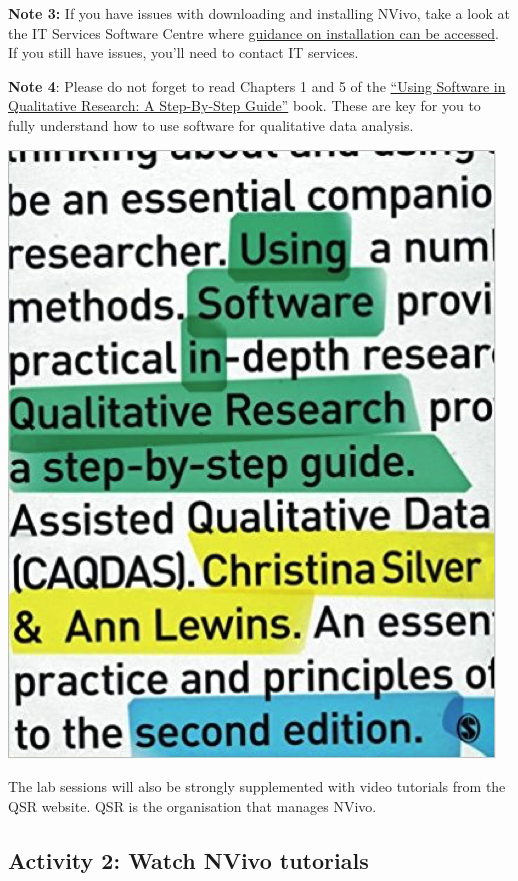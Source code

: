 \documentclass[
]{book}
\begin{document}
\textbf{Note 3:} If you have issues with downloading and installing NVivo, take a look at the IT Services Software Centre where \href{https://manchester.saasiteu.com/Modules/SelfService/?NoDefaultProvider=True\#knowledgeBase/view/60A01BC1B8C84E6C8C8FE2B3C73B84E4}{guidance on installation can be accessed}. If you still have issues, you'll need to contact IT services.

\textbf{Note 4}: Please do not forget to read Chapters 1 and 5 of the \href{https://www.librarysearch.manchester.ac.uk/permalink/44MAN_INST/bofker/alma992976454286501631}{``Using Software in Qualitative Research: A Step-By-Step Guide''} book. These are key for you to fully understand how to use software for qualitative data analysis.

\includegraphics{imgs/qual_01.png}

The lab sessions will also be strongly supplemented with video tutorials from the QSR website. QSR is the organisation that manages NVivo.

\hypertarget{activity-2-watch-nvivo-tutorials}{%
\subsection{Activity 2: Watch NVivo tutorials}\label{activity-2-watch-nvivo-tutorials}}
\end{document}
